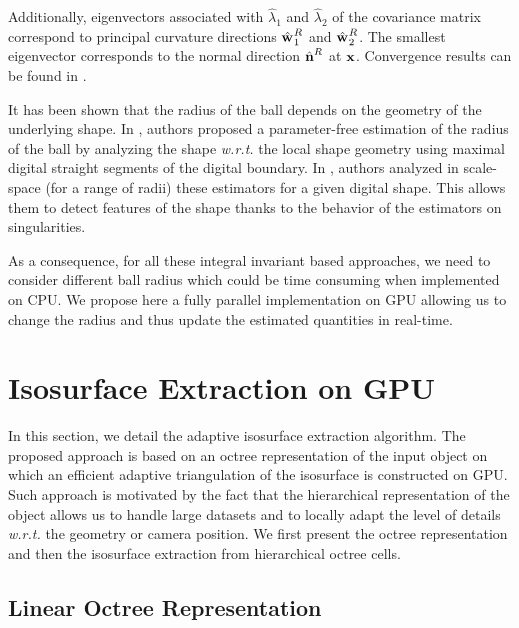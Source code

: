 \documentclass{llncs}
\newcommand{\wrt}{\emph{w.r.t.} }
\begin{document}
Additionally, eigenvectors associated with $\hat{\lambda}_1$ and
$\hat{\lambda}_2$ of the covariance matrix correspond to principal curvature
directions $\hat{\mathbf{w}_{}}_{1}^{R}$ and $\hat{\mathbf{w}_{}}_{2}^{R}$. The smallest eigenvector
corresponds to the normal direction $\hat{\mathbf{n}{}}^{R}$ at $\mathbf{x}$. Convergence
results can be found in \cite{CVIU2014}.%

It has been shown that the radius of the ball depends on the geometry of the
underlying shape. In \cite{DGCI2014}, authors proposed a parameter-free
estimation of the radius of the ball by analyzing the shape \wrt the local shape
geometry using maximal digital straight segments of the digital boundary. In
\cite{SMI2015}, authors analyzed in scale-space (for a range of radii) these
estimators for a given digital shape. This allows them to detect features of the
shape thanks to the behavior of the estimators on singularities.

As a consequence, for all these integral invariant based approaches, we need to
consider different ball radius which could be time consuming when implemented on
CPU. We propose here a fully parallel implementation on GPU allowing us to
change the radius and thus update the estimated quantities in real-time.

\section{Isosurface Extraction on GPU}
\label{sec:isos-extr-gpu}

In this section, we detail the adaptive isosurface extraction
algorithm. The proposed approach is based on an octree representation
of the input object on which an efficient adaptive triangulation
of the isosurface is constructed on GPU. Such approach is motivated by
the fact that the hierarchical representation of the object allows us
to handle large datasets and to locally adapt the level of details
\wrt the geometry or camera position. We first present the
octree representation and then the isosurface extraction from
hierarchical octree cells.

\subsection{Linear Octree Representation}
\end{document}
